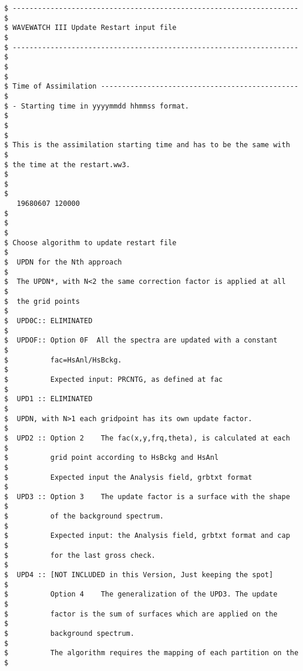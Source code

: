\begin{footnotesize}
\begin{verbatim}
$ -------------------------------------------------------------------- $
$ WAVEWATCH III Update Restart input file                              $
$ -------------------------------------------------------------------- $
$                                                                      $
$ Time of Assimilation ----------------------------------------------- $
$ - Starting time in yyyymmdd hhmmss format.                           $
$                                                                      $
$ This is the assimilation starting time and has to be the same with   $
$ the time at the restart.ww3.                                         $
$                                                                      $
   19680607 120000                                                     $
$                                                                      $
$ Choose algorithm to update restart file                              $
$  UPDN for the Nth approach                                           $
$  The UPDN*, with N<2 the same correction factor is applied at all    $
$  the grid points                                                     $
$  UPD0C:: ELIMINATED                                                  $
$  UPDOF:: Option 0F  All the spectra are updated with a constant      $
$          fac=HsAnl/HsBckg.                                           $
$          Expected input: PRCNTG, as defined at fac                   $
$  UPD1 :: ELIMINATED                                                  $
$  UPDN, with N>1 each gridpoint has its own update factor.            $
$  UPD2 :: Option 2    The fac(x,y,frq,theta), is calculated at each   $
$          grid point according to HsBckg and HsAnl                    $
$          Expected input the Analysis field, grbtxt format            $
$  UPD3 :: Option 3    The update factor is a surface with the shape   $
$          of the background spectrum.                                 $
$          Expected input: the Analysis field, grbtxt format and cap   $
$          for the last gross check.                                   $
$  UPD4 :: [NOT INCLUDED in this Version, Just keeping the spot]       $
$          Option 4    The generalization of the UPD3. The update      $
$          factor is the sum of surfaces which are applied on the      $
$          background spectrum.                                        $
$          The algorithm requires the mapping of each partition on the $

\end{verbatim}
\end{footnotesize}
